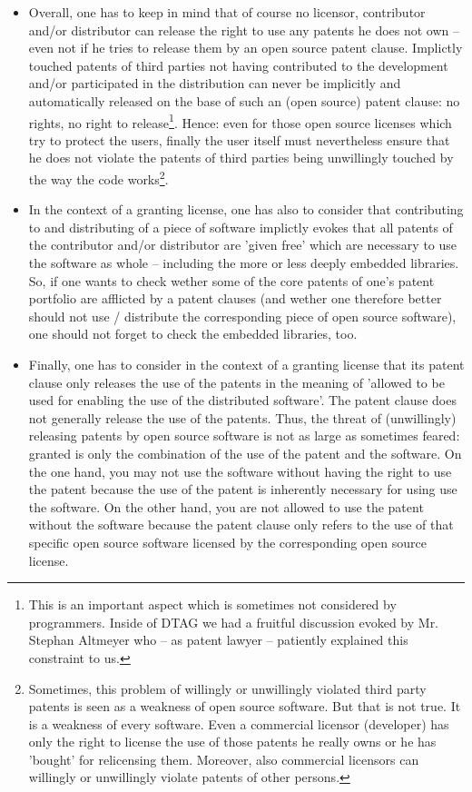 \begin{itemize}
  
  \item Overall, one has to keep in mind that of course no licensor, contributor
  and/or distributor can release the right to use any patents he does not own --
  even not if he tries to release them by an open source patent clause.
  Implictly touched patents of third parties not having contributed to the
  development and/or participated in the distribution can never be implicitly
  and automatically released on the base of such an (open source) patent clause:
  no rights, no right to release\footnote{This is an important aspect which is
  sometimes not considered by programmers. Inside of DTAG we had a fruitful
  discussion evoked by Mr. Stephan Altmeyer who -- as patent lawyer -- patiently
  explained this constraint to us.}. Hence: even for those open source licenses
  which try to protect the users, finally the user itself must nevertheless
  ensure that he does not violate the patents of third parties being unwillingly
  touched by the way the code works\footnote{Sometimes, this problem of
  willingly or unwillingly violated third party patents is seen as a weakness of
  open source software. But that is not true. It is a weakness of every
  software. Even a commercial licensor (developer) has only the right to license
  the use of those patents he really owns or he has 'bought' for relicensing
  them. Moreover, also commercial licensors can willingly or unwillingly violate
  patents of other persons.}.
  
  \item In the context of a granting license, one has also to consider that
  contributing to and distributing of a piece of software implictly evokes that
  all patents of the contributor and/or distributor are 'given free' which are
  necessary to use the software as whole -- including the more or less deeply
  embedded libraries. So, if one wants to check wether some of the core patents
  of one's patent portfolio are afflicted by a patent clauses (and wether one
  therefore better should not use / distribute the corresponding piece of open
  source software), one should not forget to check the embedded libraries, too.
  
  \item Finally, one has to consider in the context of a granting license that
  its patent clause only releases the use of the patents in the meaning of
  'allowed to be used for enabling the use of the distributed software'. The
  patent clause does not generally release the use of the patents. Thus, the
  threat of (unwillingly) releasing patents by open source software is not as
  large as sometimes feared: granted is only the combination of the use of the
  patent and the software. On the one hand, you may not use the software without
  having the right to use the patent because the use of the patent is inherently
  necessary for using use the software. On the other hand, you are not allowed
  to use the patent without the software because the patent clause only refers
  to the use of that specific open source software licensed by the corresponding
  open source license.


\end{itemize}
